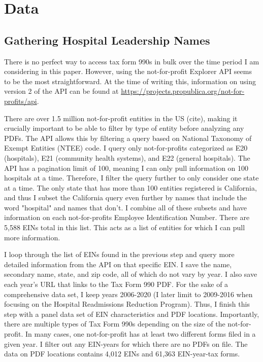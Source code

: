 \documentclass[12pt]{article}
\begin{document}
\appendix

 \section{Data}\label{appendixdata}

\subsection{Gathering Hospital Leadership Names}

There is no perfect way to access tax form 990s in bulk over the time period I am considering in this paper. However, using the not-for-profit Explorer API seems to be the most straightforward. At the time of writing this, information on using version 2 of the API can be found at \hyperlink{https://projects.propublica.org/not-for-profits/api}{https://projects.propublica.org/not-for-profits/api}. 
    
There are over 1.5 million not-for-profit entities in the US (cite), making it crucially important to be able to filter by type of entity before analyzing any PDFs. The API allows this by filtering a query based on National Taxonomy of Exempt Entities (NTEE) code. I query only not-for-profits categorized as E20 (hospitals), E21 (community health systems), and E22 (general hospitals). The API has a pagination limit of 100, meaning I can only pull information on 100 hospitals at a time. Therefore, I filter the query further to only consider one state at a time. The only state that has more than 100 entities registered is California, and thus I subset the California query even further by names that include the word "hospital" and names that don't. I combine all of these subsets and have information on each not-for-profits Employee Identification Number. There are 5,588 EINs total in this list. This acts as a list of entities for which I can pull more information. 

I loop through the list of EINs found in the previous step and query more detailed information from the API on that specific EIN. I save the name, secondary name, state, and zip code, all of which do not vary by year. I also save each year's URL that links to the Tax Form 990 PDF. For the sake of a comprehensive data set, I keep years 2006-2020 (I later limit to 2009-2016 when focusing on the Hospital Readmissions Reduction Program). Thus, I finish this step with a panel data set of EIN characteristics and PDF locations. Importantly, there are multiple types of Tax Form 990s depending on the size of the not-for-profit. In many cases, one not-for-profit has at least two different forms filed in a given year. I filter out any EIN-years for which there are no PDFs on file. The data on PDF locations contains 4,012 EINs and 61,363 EIN-year-tax forms.
\end{document}
